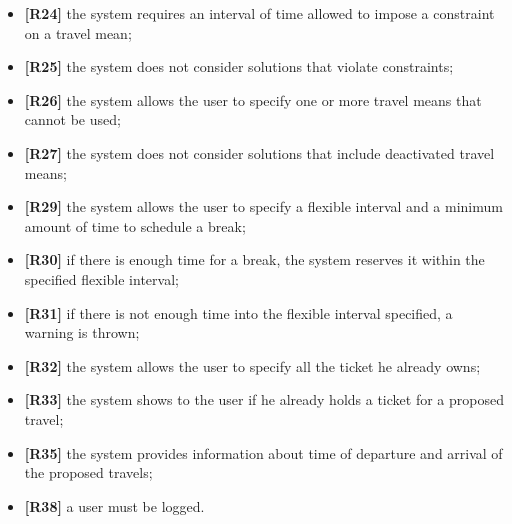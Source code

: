 \begin{itemize}
	\item \textbf{[R24]} the system requires an interval of time allowed to impose a constraint on a travel mean;
	\item \textbf{[R25]} the system does not consider solutions that violate constraints;
	\item \textbf{[R26]} the system allows the user to specify one or more travel means that cannot be used;
	\item \textbf{[R27]} the system does not consider solutions that include deactivated travel means; 
	\item \textbf{[R29]} the system allows the user to specify a flexible interval and a minimum amount of time to schedule a break;
	\item \textbf{[R30]} if there is enough time for a break, the system reserves it within the specified flexible interval;
	\item \textbf{[R31]} if there is not enough time into the flexible interval specified, a warning is thrown;
	\item \textbf{[R32]} the system allows the user to specify all the ticket he already owns;
	\item \textbf{[R33]} the system shows to the user if he already holds a ticket for a proposed travel;
	\item \textbf{[R35]} the system provides information about time of departure and arrival of the proposed travels;
	\item \textbf{[R38]} a user must be logged. 
\end{itemize}

